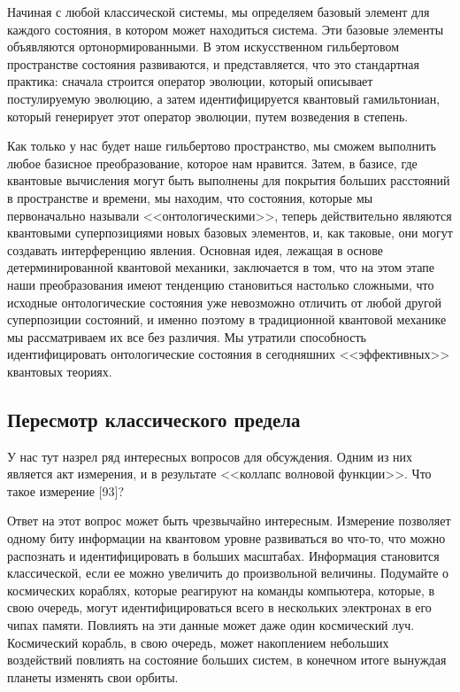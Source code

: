 \documentclass[main.tex]{subfiles}
\begin{document}
Начиная с любой классической системы, мы определяем базовый элемент для каждого состояния, в котором может находиться система. Эти базовые элементы объявляются ортонормированными. В этом искусственном гильбертовом пространстве состояния развиваются, и представляется, что это стандартная практика: сначала строится оператор эволюции, который описывает постулируемую эволюцию, а затем идентифицируется квантовый гамильтониан, который генерирует этот оператор эволюции, путем возведения в степень.

Как только у нас будет наше гильбертово пространство, мы сможем выполнить любое базисное преобразование, которое нам нравится. Затем, в базисе, где квантовые вычисления могут быть выполнены для покрытия больших расстояний в пространстве и времени, мы находим, что состояния, которые мы первоначально называли <<онтологическими>>, теперь действительно являются квантовыми суперпозициями новых базовых элементов, и, как таковые, они могут создавать интерференцию явления. Основная идея, лежащая в основе детерминированной квантовой механики, заключается в том, что на этом этапе наши преобразования имеют тенденцию становиться настолько сложными, что исходные онтологические состояния уже невозможно отличить от любой другой суперпозиции состояний, и именно поэтому в традиционной квантовой механике мы рассматриваем их все без различия. Мы утратили способность идентифицировать онтологические состояния в сегодняшних <<эффективных>> квантовых теориях.

\subsection{Пересмотр классического предела}\label{ch4.2}

У нас тут назрел ряд интересных вопросов для обсуждения. Одним из них является акт измерения, и в результате <<коллапс волновой функции>>. Что такое измерение [93]?

Ответ на этот вопрос может быть чрезвычайно интересным. Измерение позволяет одному биту информации на квантовом уровне развиваться во что-то, что можно распознать и идентифицировать в больших масштабах. Информация становится классической, если ее можно увеличить до произвольной величины. Подумайте о космических кораблях, которые реагируют на команды компьютера, которые, в свою очередь, могут идентифицироваться всего в нескольких электронах в его чипах памяти. Повлиять на эти данные может даже один космический луч. Космический корабль, в свою очередь, может накоплением небольших воздействий повлиять на состояние больших систем, в конечном итоге вынуждая планеты изменять свои орбиты.
\end{document}
